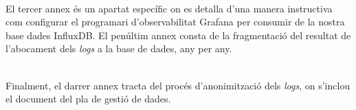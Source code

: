 \noindent \\
El tercer annex és un apartat específic on es detalla d'una manera instructiva com configurar el programari d'observabilitat Grafana per consumir de la nostra base dades InfluxDB.
El penúltim annex consta de la fragmentació del resultat de l'abocament dels \textit{\gls{log}s} a la base de dades, any per any.

\noindent \\
Finalment, el darrer annex tracta del procés d'anonimització dels \textit{\gls{log}s}, on s'inclou el document del pla de gestió de dades.